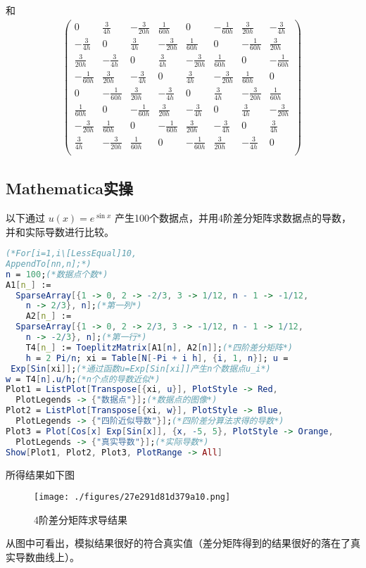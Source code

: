 和
\begin{equation}
\begin{aligned}
\left(
\begin{array}{cccccccc}
 0 & \frac{3}{4 h} & -\frac{3}{20 h} & \frac{1}{60 h} & 0 & -\frac{1}{60 h} & \frac{3}{20 h} & -\frac{3}{4 h} \\
 -\frac{3}{4 h} & 0 & \frac{3}{4 h} & -\frac{3}{20 h} & \frac{1}{60 h} & 0 & -\frac{1}{60 h} & \frac{3}{20 h} \\
 \frac{3}{20 h} & -\frac{3}{4 h} & 0 & \frac{3}{4 h} & -\frac{3}{20 h} & \frac{1}{60 h} & 0 & -\frac{1}{60 h} \\
 -\frac{1}{60 h} & \frac{3}{20 h} & -\frac{3}{4 h} & 0 & \frac{3}{4 h} & -\frac{3}{20 h} & \frac{1}{60 h} & 0 \\
 0 & -\frac{1}{60 h} & \frac{3}{20 h} & -\frac{3}{4 h} & 0 & \frac{3}{4 h} & -\frac{3}{20 h} & \frac{1}{60 h} \\
 \frac{1}{60 h} & 0 & -\frac{1}{60 h} & \frac{3}{20 h} & -\frac{3}{4 h} & 0 & \frac{3}{4 h} & -\frac{3}{20 h} \\
 -\frac{3}{20 h} & \frac{1}{60 h} & 0 & -\frac{1}{60 h} & \frac{3}{20 h} & -\frac{3}{4 h} & 0 & \frac{3}{4 h} \\
 \frac{3}{4 h} & -\frac{3}{20 h} & \frac{1}{60 h} & 0 & -\frac{1}{60 h} & \frac{3}{20 h} & -\frac{3}{4 h} & 0 \\
\end{array}
\right)
\end{aligned}~
\end{equation}

\subsection{Mathematica实操}
以下通过 $u(x)=e^{\sin x}$ 产生100个数据点，并用4阶差分矩阵求数据点的导数，并和实际导数进行比较。
\begin{lstlisting}[language=mathematica, caption=Mathematica利用四阶差分矩阵求导数，数据点由 $u(x)=e^{\sin x}$ 产生]
(*For[i=1,i\[LessEqual]10,
AppendTo[nn,n];*)
n = 100;(*数据点个数*)
A1[n_] := 
  SparseArray[{1 -> 0, 2 -> -2/3, 3 -> 1/12, n - 1 -> -1/12, 
    n -> 2/3}, n];(*第一列*)
	A2[n_] := 
  SparseArray[{1 -> 0, 2 -> 2/3, 3 -> -1/12, n - 1 -> 1/12, 
    n -> -2/3}, n];(*第一行*)
	T4[n_] := ToeplitzMatrix[A1[n], A2[n]];(*四阶差分矩阵*)
	h = 2 Pi/n; xi = Table[N[-Pi + i h], {i, 1, n}]; u = 
 Exp[Sin[xi]];(*通过函数u=Exp[Sin[xi]]产生n个数据点u_i*)
w = T4[n].u/h;(*n个点的导数近似*)
Plot1 = ListPlot[Transpose[{xi, u}], PlotStyle -> Red, 
  PlotLegends -> {"数据点"}];(*数据点的图像*)
Plot2 = ListPlot[Transpose[{xi, w}], PlotStyle -> Blue, 
  PlotLegends -> {"四阶近似导数"}];(*四阶差分算法求得的导数*)
Plot3 = Plot[Cos[x] Exp[Sin[x]], {x, -5, 5}, PlotStyle -> Orange, 
  PlotLegends -> {"真实导数"}];(*实际导数*)
Show[Plot1, Plot2, Plot3, PlotRange -> All]
\end{lstlisting}
所得结果如下图
\begin{figure}[ht]
\centering
\texttt{[image: ./figures/27e291d81d379a10.png]}
\caption{4阶差分矩阵求导结果} \label{fig_DifMa_1}
\end{figure}
从图中可看出，模拟结果很好的符合真实值（差分矩阵得到的结果很好的落在了真实导数曲线上）。

